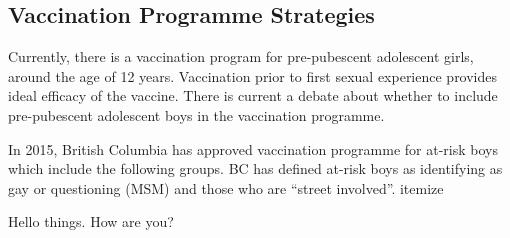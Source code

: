 \documentclass[12pt]{article}
\begin{document}
\subsection{Vaccination Programme Strategies}

Currently, there is a vaccination program for pre-pubescent adolescent girls, around the age of 12 years.  Vaccination prior to first sexual experience provides ideal efficacy of the vaccine. There is current a debate about whether to include pre-pubescent adolescent boys in the vaccination programme. 

In 2015, British Columbia has approved vaccination programme for at-risk boys which include the following groups.  BC has defined at-risk boys as identifying as gay or questioning (MSM) and those who are ``street involved''.
{itemize}

Hello things.  How are you?

\newpage


\end{document}
